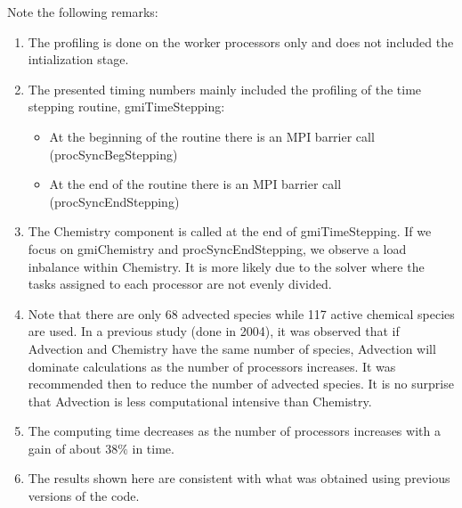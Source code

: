 %
Note the following remarks:
%
\begin{enumerate}
\item The profiling is done on the worker processors only and does not 
      included the intialization stage.
\item The presented timing numbers mainly included the profiling of the 
      time stepping routine, gmiTimeStepping:
      \begin{itemize}
      \item At the beginning of the routine there is an MPI barrier call 
            (procSyncBegStepping)
      \item At the end of the routine there is an MPI barrier call 
            (procSyncEndStepping)
      \end{itemize}
\item The Chemistry component is called at the end of gmiTimeStepping. 
      If we focus on gmiChemistry and procSyncEndStepping, we observe a 
      load inbalance within Chemistry. It is more likely due to the solver 
      where the tasks assigned to each processor are not evenly divided. 
\item Note that there are only 68 advected species while 117 active chemical 
      species are used. In a previous study (done in 2004), it was observed 
      that if Advection and Chemistry have the same number of species, 
      Advection will dominate calculations as the number of processors increases.
      It was recommended then to reduce the number of advected species.
      It is no surprise that Advection is less computational intensive
      than Chemistry.
\item The computing time decreases as the number of processors increases
      with a gain of about $38\%$ in time.
\item The results shown here are consistent with what was obtained using
      previous versions of the code.
\end{enumerate}
